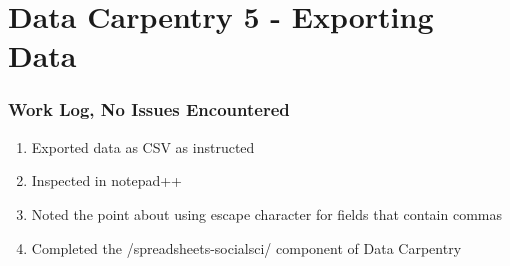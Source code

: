 \documentclass{article}
\begin{document}
\section{Data Carpentry 5 - Exporting Data}
\subsubsection{Work Log, No Issues Encountered}
\begin{enumerate}
    \item Exported data as CSV as instructed
    \item Inspected in notepad++
    \item Noted the point about using escape character for fields that contain commas
    \item Completed the /spreadsheets-socialsci/ component of Data Carpentry
\end{enumerate}
\end{document}
